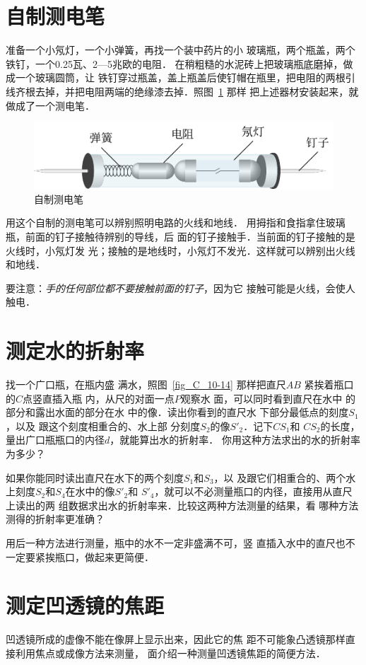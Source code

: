 \section{自制测电笔}
准备一个小氖灯，一个小弹簧，再找一个装中药片的小
玻璃瓶，两个瓶盖，两个铁钉，一个0.25瓦、2—5兆欧的电阻．
在稍粗糙的水泥砖上把玻璃瓶底磨掉，做成一个玻璃圆筒，让
铁钉穿过瓶盖，盖上瓶盖后使钉帽在瓶里，把电阻的两根引
线齐根去掉，并把电阻两端的绝缘漆去掉．照图~\ref{fig_C_10-13} 那样
把上述器材安装起来，就做成了一个测电笔．
\begin{figure}[htbp]
    \centering
    \includegraphics{fig/C/10-13.pdf}
    \caption{自制测电笔}\label{fig_C_10-13}
\end{figure}

用这个自制的测电笔可以辨别照明电路的火线和地线．
用拇指和食指拿住玻璃瓶，前面的钉子接触待辨别的导线，后
面的钉子接触手．当前面的钉子接触的是火线时，小氖灯发
光；接触的是地线时，小氖灯不发光．这样就可以辨别出火线
和地线．

要注意：\textit{手的任何部位都不要接触前面的钉子}，因为它
接触可能是火线，会使人触电．

\section{测定水的折射率}
找一个广口瓶，在瓶内盛
满水，照图~\ref{fig_C_10-14} 那样把直尺$AB$
紧挨着瓶口的$C$点竖直插入瓶
内，从尺的对面一点$P$观察水
面，可以同时看到直尺在水中
的部分和露出水面的部分在水
中的像．读出你看到的直尺水
下部分最低点的刻度$S_1$，以及
跟这个刻度相重合的、水上部
分刻度$S_2$的像$S'_2$．记下$CS_1$和
$CS_2$的长度，量出广口瓶瓶口的内径$d$，就能算出水的折射率．
你用这种方法求出的水的折射率为多少？
 
如果你能同时读出直尺在水下的两个刻度$S_1$和$S_3$，以
及跟它们相重合的、两个水上刻度$S_2$和$S_4$在水中的像$S'_2$和
$S'_4$，就可以不必测量瓶口的内径，直接用从直尺上读出的两
组数据求出水的折射率来．比较这两种方法测量的结果，看
哪种方法测得的折射率更准确？

用后一种方法进行测量，瓶中的水不一定非盛满不可，竖
直插入水中的直尺也不一定要紧挨瓶口，做起来更简便．

\section{测定凹透镜的焦距}
凹透镜所成的虚像不能在像屏上显示出来，因此它的焦
距不可能象凸透镜那样直接利用焦点或成像方法来测量，
面介绍一种测量凹透镜焦距的简便方法．

